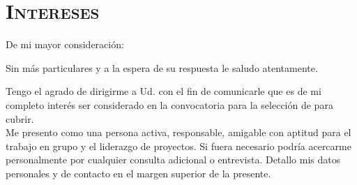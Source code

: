 \documentclass[11pt,a4paper]{moderncv}
\begin{document}
\section{\textsc{Intereses}}




%


\clearpage

\date{Córdoba, Viernes 5 de Diciembre de 2014.}
\opening{De mi mayor consideración:}
\closing{Sin más particulares y a la espera de su respuesta le saludo atentamente.}
\makelettertitle

Tengo el agrado de dirigirme a Ud. con el fin de comunicarle que es de mi completo interés ser considerado en la convocatoria para la selección de para cubrir.\\
Me presento como una persona activa, responsable, amigable con aptitud para el trabajo en grupo y el liderazgo de proyectos.
Si fuera necesario podría acercarme personalmente por cualquier consulta adicional o entrevista. Detallo mis datos personales y de contacto en el margen superior de la presente.


\makeletterclosing
\end{document}
